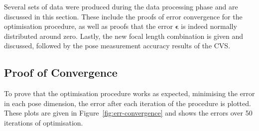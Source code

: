 Several sets of data were produced during the data processing phase and are discussed in this section. These include the proofs of error convergence for the optimisation procedure, as well as proofs that the error $\bm{\epsilon}$ is indeed normally distributed around zero. Lastly, the new focal length combination is given and discussed, followed by the pose measurement accuracy results of the CVS. 

\subsection{Proof of Convergence}

To prove that the optimisation procedure works as expected, minimising the error in each pose dimension, the error after each iteration of the procedure is plotted. These plots are given in Figure~\ref{fig:err-convergence} and shows the errors over 50 iterations of optimisation.  

